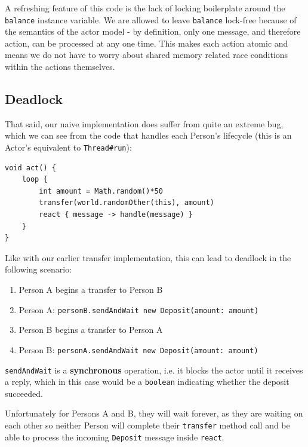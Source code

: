 \documentclass[a4paper,12pt]{kth-mag}
\begin{document}
A refreshing feature of this code is the lack of locking boilerplate around the \texttt{balance} instance variable. We are allowed to leave \texttt{balance} lock-free because of the semantics of the actor model - by definition, only one message, and therefore action, can be processed at any one time. This makes each action atomic and means we do not have to worry about shared memory related race conditions within the actions themselves.

\subsection{Deadlock}

That said, our naive implementation does suffer from quite an extreme bug, which we can see from the code that handles each Person's lifecycle (this is an Actor's equivalent to \texttt{Thread\#run}):

\begin{listing}[H]
	\begin{verbatim}
void act() {
    loop {
        int amount = Math.random()*50
        transfer(world.randomOther(this), amount)
        react { message -> handle(message) }
    }
}
	\end{verbatim}
\end{listing}

Like with our earlier transfer implementation, this can lead to deadlock in the following scenario:

\begin{enumerate}
\item Person A begins a transfer to Person B
\item Person A: \texttt{personB.sendAndWait new Deposit(amount: amount)}
\item Person B begins a transfer to Person A
\item Person B: \texttt{personA.sendAndWait new Deposit(amount: amount)}
\end{enumerate}

\texttt{sendAndWait} is a \textbf{synchronous} operation, i.e. it blocks the actor until it receives a reply, which in this case would be a \texttt{boolean} indicating whether the deposit succeeded.

Unfortunately for Persons A and B, they will wait forever, as they are waiting on each other so neither Person will complete their \texttt{transfer} method call and be able to process the incoming \texttt{Deposit} message inside \texttt{react}.
\end{document}
